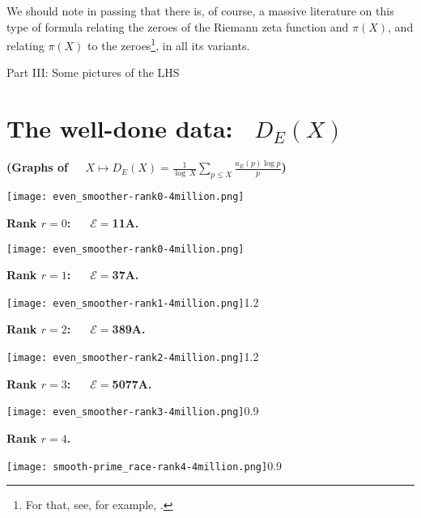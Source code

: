 \documentclass[11pt]{article}
\theoremstyle{plain}
\theoremstyle{definition}
\numberwithin{equation}{section}
\numberwithin{figure}{section}
\numberwithin{table}{section}
\begin{document}
We should note in passing that there is, of course, a massive literature on this type of formula relating the zeroes of the Riemann zeta function and $\pi(X)$, and relating $\pi(X)$ to the zeroes{\footnote{ For that, see, for example, \cite{G}.}}, in all its variants.


\newpage
 \centerline{ \Large{ Part III: Some pictures of the LHS}}
  \vskip30pt


     \section{The well-done data: \  $ {D}_E(X)$}
   \vskip40pt

      \centerline{\bf (Graphs of \ \   $X\mapsto {D}_E(X) = {\frac{1}{\log\ X}}\sum_{p \le X}{\frac{a_E(p)\log p}{ p}}$) }
      \vskip40pt

    \texttt{[image: even\_smoother-rank0-4million.png]}
  \centerline{\bf Rank $r=0$:\ \ \  ${\mathcal E}=$11A.}
   \vskip20pt
    \texttt{[image: even\_smoother-rank0-4million.png]}


 \vskip40pt


  \centerline{\bf Rank $r=1$:\ \ \  ${\mathcal E}=$37A.}


   \vskip20pt



     \texttt{[image: even\_smoother-rank1-4million.png]}{1.2}~\label{s37}
%

   \newpage


  \centerline{\bf Rank $r=2$:\ \ \  ${\mathcal E}=$389A.}


  \vskip20pt




     \texttt{[image: even\_smoother-rank2-4million.png]}{1.2}~\label{s389}


 \vskip20pt


  \centerline{\bf Rank $r=3$:\ \ \  ${\mathcal E}=$5077A.}


 \vskip20pt



     \texttt{[image: even\_smoother-rank3-4million.png]}{0.9}~\label{s5077}


  \vskip10pt

  \centerline{\bf Rank $r=4$.}


  \vskip20pt


     \texttt{[image: smooth-prime\_race-rank4-4million.png]}{0.9}~\label{sr4}
\end{document}
